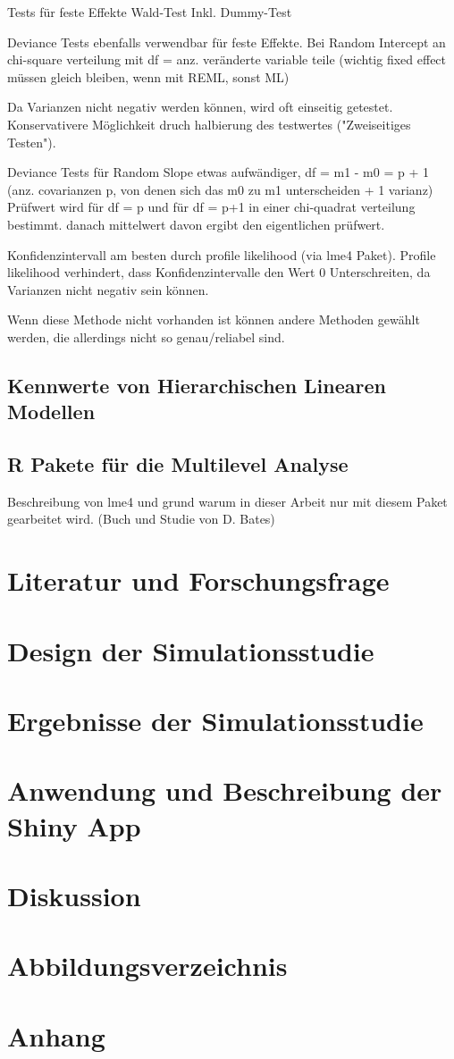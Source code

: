 \documentclass[12pt]{article}\usepackage[]{graphicx}\usepackage[]{color}
\begin{document}
Tests für feste Effekte Wald-Test \cite{SnijdersTomA.B2012Ma:a} Inkl. Dummy-Test

Deviance Tests ebenfalls verwendbar für feste Effekte. Bei Random Intercept an chi-square verteilung mit df = anz. veränderte variable teile (wichtig fixed effect müssen gleich bleiben, wenn mit REML, sonst ML)

Da Varianzen nicht negativ werden können, wird oft einseitig getestet. Konservativere Möglichkeit druch halbierung des testwertes ("Zweiseitiges Testen").


Deviance Tests für Random Slope etwas aufwändiger, df = m1 - m0 = p + 1 (anz. covarianzen p, von denen sich das m0 zu m1 unterscheiden + 1 varianz) Prüfwert wird für df = p und für df = p+1 in einer chi-quadrat verteilung bestimmt. danach mittelwert davon ergibt den eigentlichen prüfwert. 

Konfidenzintervall am besten durch profile likelihood (via lme4 Paket). Profile likelihood verhindert, dass Konfidenzintervalle den Wert 0 Unterschreiten, da Varianzen nicht negativ sein können. 

Wenn diese Methode nicht vorhanden ist können andere Methoden gewählt werden, die allerdings nicht so genau/reliabel sind.

\subsection{Kennwerte von Hierarchischen Linearen Modellen}

\subsection{R Pakete für die Multilevel Analyse}
Beschreibung von lme4 und grund warum in dieser Arbeit nur mit diesem Paket gearbeitet wird. (Buch und Studie von D. Bates)

\section{Literatur und Forschungsfrage}

\section{Design der Simulationsstudie}

\section{Ergebnisse der Simulationsstudie}
\section{Anwendung und Beschreibung der Shiny App}
\section{Diskussion}
\newpage



\section{Abbildungsverzeichnis}
\section{Anhang}
\end{document}
